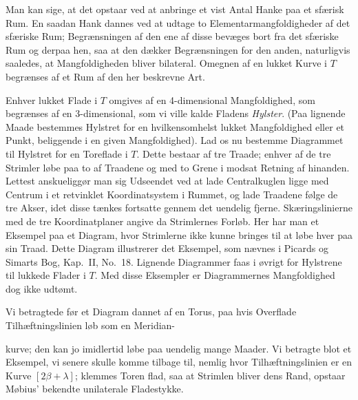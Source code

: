 \documentclass{article}
\begin{document}
Man kan sige, at det opstaar ved at anbringe et vist Antal Hanke paa et sfærisk Rum. En saadan Hank dannes ved at udtage to Elementarmangfoldigheder af det sfæriske Rum; Begrænsningen af den ene af disse bevæges bort fra det sfæriske Rum og derpaa hen, saa at den dækker Begrænsningen for den anden, naturligvis saaledes, at Mangfoldigheden bliver bilateral. Omegnen af en lukket Kurve i $T$ begrænses af et Rum af den her beskrevne Art.

Enhver lukket Flade i $T$ omgives af en 4-dimensional Mangfoldighed, som begrænses af en 3-dimensional, som vi ville kalde Fladens \emph{Hylster}. (Paa lignende Maade bestemmes Hylstret for en hvilkensomhelst lukket Mangfoldighed eller et Punkt, beliggende i en given Mangfoldighed). Lad os nu bestemme Diagrammet til Hylstret for en Toreflade i $T$. Dette bestaar af tre Traade; enhver af de tre Strimler løbe paa to af Traadene og med to Grene i modsat Retning af hinanden. Lettest anskueliggør man sig Udseendet ved at lade Centralkuglen ligge med Centrum i et retvinklet Koordinatsystem i Rummet, og lade Traadene følge de tre Akser, idet disse tænkes fortsatte gennem det uendelig fjerne. Skæringslinierne med de tre Koordinatplaner angive da Strimlernes Forløb. Her har man et Eksempel paa et Diagram, hvor Strimlerne ikke kunne bringes til at løbe hver paa sin Traad. Dette Diagram illustrerer det Eksempel, som nævnes i Picards og Simarts Bog, Kap.\ II, No.\ 18. Lignende Diagrammer faas i øvrigt for Hylstrene til lukkede Flader i $T$. Med disse Eksempler er Diagrammernes Mangfoldighed dog ikke udtømt.

Vi betragtede før et Diagram dannet af en Torus, paa hvis Overflade Tilhæftningslinien løb som en Meridian-

kurve; den kan jo imidlertid løbe paa uendelig mange Maader. Vi betragte blot et Eksempel, vi senere skulle komme tilbage til, nemlig hvor Tilhæftningslinien er en Kurve $[2\beta + \lambda]$; klemmes Toren flad, saa at Strimlen bliver dens Rand, opstaar Møbius' bekendte unilaterale Fladestykke.
\end{document}

